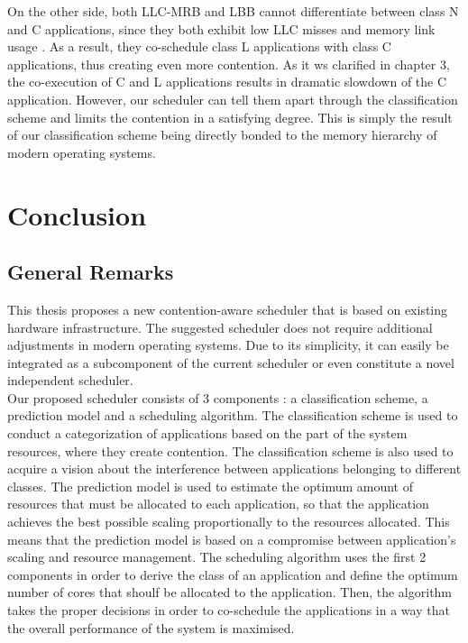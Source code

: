 \documentclass[diploma]{Styles/softlab-thesis}
\begin{document}
On the other side, both LLC-MRB and LBB cannot differentiate between class N and C applications, since they both exhibit low LLC misses and memory link usage \cite{reference1}. As a result, they co-schedule class L applications with class C applications, thus creating even more contention. As it ws clarified in chapter 3, the co-execution of C and L applications results in dramatic slowdown of the C application. However, our scheduler can tell them apart through the classification scheme and limits the contention in a satisfying degree. This is simply the result of our classification scheme being directly bonded to the memory hierarchy of modern operating systems. \\

\chapter{Conclusion}

\section{General Remarks}

This thesis proposes a new contention-aware scheduler that is based on existing hardware infrastructure. The suggested scheduler does not require additional adjustments in modern operating systems. Due to its simplicity, it can easily be integrated as a subcomponent of the current scheduler or even constitute a novel independent scheduler. \\

Our proposed scheduler consists of 3 components : a classification scheme, a prediction model and a scheduling algorithm. The classification scheme is used to conduct a categorization of applications based on the part of the system resources, where they create contention. The classification scheme is also used to acquire a vision about the interference between applications belonging to different classes. The prediction model is used to estimate the optimum amount of resources that must be allocated to each application, so that the application achieves the best possible scaling proportionally to the resources allocated. This means that the prediction model is based on a compromise between application's scaling and resource management. The scheduling algorithm uses the first 2 components in order to derive the class of an application and define the optimum number of cores that shoulf be allocated to the application. Then, the algorithm takes the proper decisions in order to co-schedule the applications in a way that the overall performance of the system is maximised. \\
\end{document}
